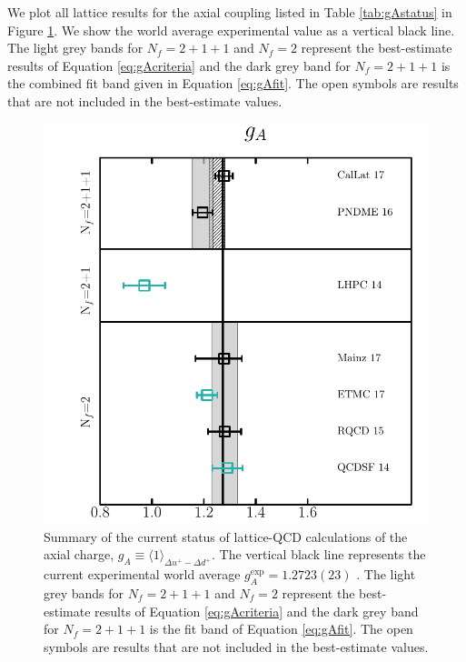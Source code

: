 We plot all lattice results for the axial coupling listed in Table \ref{tab:gAstatus} in Figure \ref{fig:gaLQCDstatus}. We show the world average experimental value as a vertical
black line. The light grey bands for $N_f = 2+1+1$ and $N_f=2$ represent the best-estimate results of Equation \eqref{eq:gAcriteria} and the dark grey band for
$N_f = 2+1+1$ is the combined fit band given in Equation \eqref{eq:gAfit}. The open symbols are results that are not included in the best-estimate values.
\begin{figure}
\begin{center}
  \includegraphics[scale=0.5]{plots/ga_summary.pdf}
  \caption{\small Summary of the current status of lattice-QCD calculations of the axial charge, $g_A\equiv \langle 1\rangle_{\Delta u^+-\Delta d^+}$.
  The vertical black line represents the current experimental world average $g_A^{\mathrm{exp}} = 1.2723(23)$ \cite{Olive:2016xmw}. The light grey bands for $N_f = 2+1+1$ and $N_f=2$ represent the best-estimate results of Equation \eqref{eq:gAcriteria} and the dark grey band for
$N_f = 2+1+1$ is the fit band of Equation \eqref{eq:gAfit}. The open symbols are results that are not included in the best-estimate values.
    \label{fig:gaLQCDstatus}
  }
\end{center}
\end{figure}

